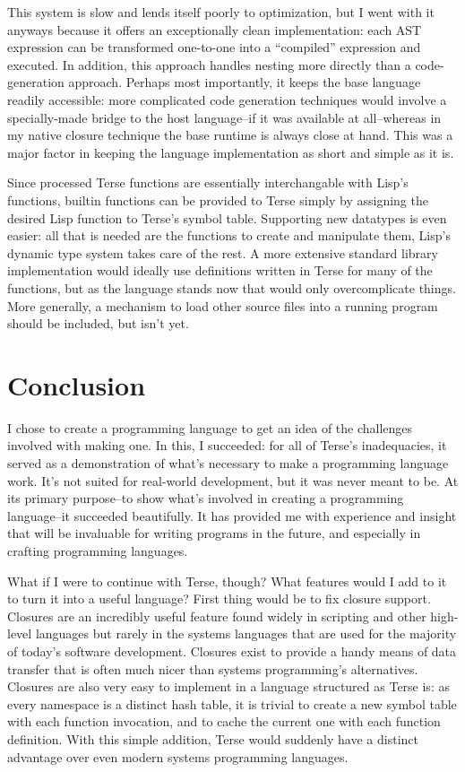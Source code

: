 \documentclass[12pt]{article}
\begin{document}
This system is slow and lends itself poorly to optimization, but I
went with it anyways because it offers an exceptionally clean
implementation: each AST expression can be transformed one-to-one into
a ``compiled'' expression and executed. In addition, this approach
handles nesting more directly than a code-generation approach. Perhaps
most importantly, it keeps the base language readily accessible: more
complicated code generation techniques would involve a specially-made
bridge to the host language--if it was available at all--whereas in my
native closure technique the base runtime is always close at
hand. This was a major factor in keeping the language implementation
as short and simple as it is.

Since processed Terse functions are essentially interchangable with
Lisp's functions, builtin functions can be provided to Terse simply by
assigning the desired Lisp function to Terse's symbol
table. Supporting new datatypes is even easier: all that is needed are
the functions to create and manipulate them, Lisp's dynamic type
system takes care of the rest. A more extensive standard library
implementation would ideally use definitions written in Terse for many
of the functions, but as the language stands now that would only
overcomplicate things. More generally, a mechanism to load other
source files into a running program should be included, but isn't yet.

\section{Conclusion}

I chose to create a programming language to get an idea of the
challenges involved with making one. In this, I succeeded: for all of
Terse's inadequacies, it served as a demonstration of what's necessary
to make a programming language work. It's not suited for real-world
development, but it was never meant to be. At its primary purpose--to
show what's involved in creating a programming language--it succeeded
beautifully. It has provided me with experience and insight that will
be invaluable for writing programs in the future, and especially in
crafting programming languages.

What if I were to continue with Terse, though? What features would I
add to it to turn it into a useful language? First thing would be to
fix closure support. Closures are an incredibly useful feature found
widely in scripting and other high-level languages but rarely in the
systems languages that are used for the majority of today's software
development. Closures exist to provide a handy means of data transfer
that is often much nicer than systems programming's
alternatives\footnotemark{}. Closures are also very easy to implement
in a language structured as Terse is: as every namespace is a distinct
hash table, it is trivial to create a new symbol table with each
function invocation, and to cache the current one with each function
definition. With this simple addition, Terse would suddenly have a
distinct advantage over even modern systems programming languages.
\end{document}

